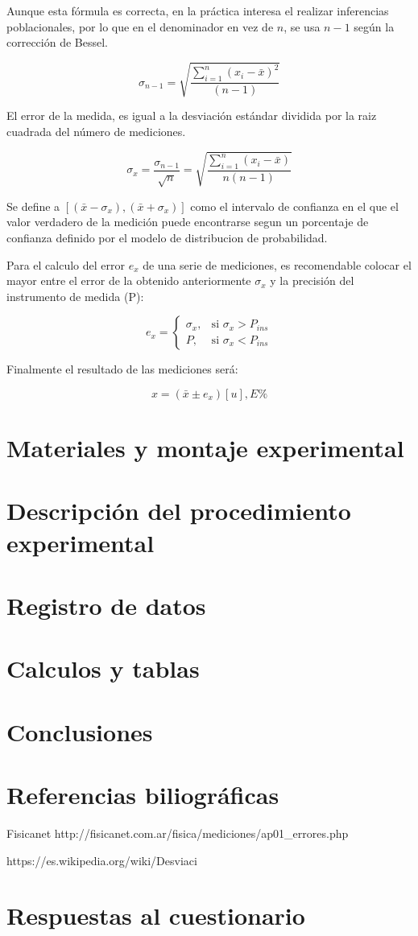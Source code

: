 \documentclass[letter,twoside,11pt]{article}
\begin{document}
Aunque esta fórmula es correcta, en la práctica interesa el realizar inferencias
poblacionales, por lo que en el denominador en vez de $n$, se usa $n-1$ según la
corrección de Bessel.

\begin{equation}
    \sigma_{n-1} = \sqrt{\frac{\sum_{i=1}^{n} (x_i-\bar{x})^2}{(n-1)}}
\end{equation}

El error de la medida, es igual a la desviación estándar dividida por la raiz
cuadrada del número de mediciones.

\begin{equation}
    \sigma_x = \frac{\sigma_{n-1}}{\sqrt{n}}
             = \sqrt{\frac{\sum_{i=1}^{n} (x_i-\bar{x})}{n(n-1)}}
\end{equation}

Se define a $[(\bar{x}-\sigma_x), (\bar{x}+\sigma_x)]$ como el intervalo de
confianza en el que el valor verdadero de la medición puede encontrarse segun un
porcentaje de confianza definido por el modelo de distribucion de probabilidad.

Para el calculo del error $e_x$ de una serie de mediciones, es recomendable
colocar el mayor entre el error de la obtenido anteriormente $\sigma_x$ y la
precisión del instrumento de medida (P):

\begin{equation}
    e_x = \begin{cases}
        \sigma_x, & \mbox{si }\sigma_x > P_{ins} \\
        P,        & \mbox{si }\sigma_x < P_{ins}
    \end{cases}
\end{equation}

Finalmente el resultado de las mediciones será:

\begin{equation}
    x = (\bar{x}\pm e_x)[u], E\%
\end{equation}

\section{Materiales y montaje experimental}
\section{Descripción del procedimiento experimental}
\section{Registro de datos}
\section{Calculos y tablas}
\section{Conclusiones}
\section{Referencias biliográficas}
Fisicanet
http://fisicanet.com.ar/fisica/mediciones/ap01\_errores.php


https://es.wikipedia.org/wiki/Desviaci%

\section{Respuestas al cuestionario}
\end{document}
